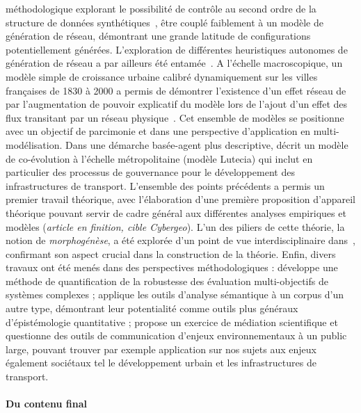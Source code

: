 méthodologique explorant le possibilité de contrôle au second ordre de la structure de données synthétiques~\cite{raimbault2016generation}, être couplé faiblement à un modèle de génération de réseau, démontrant une grande latitude de configurations potentiellement générées. L'exploration de différentes heuristiques autonomes de génération de réseau a par ailleurs été entamée~\cite{raimbault2015labex}. A l'échelle macroscopique, un modèle simple de croissance urbaine calibré dynamiquement sur les villes françaises de 1830 à 2000 a permis de démontrer l'existence d'un effet réseau de par l'augmentation de pouvoir explicatif du modèle lors de l'ajout d'un effet des flux transitant par un réseau physique~\cite{raimbault2016models}. Cet ensemble de modèles se positionne avec un objectif de parcimonie et dans une perspective d'application en multi-modélisation. Dans une démarche basée-agent plus descriptive, \cite{le2015modeling} décrit un modèle de co-évolution à l'échelle métropolitaine (modèle Lutecia) qui inclut en particulier des processus de gouvernance pour le développement des infrastructures de transport. L'ensemble des points précédents a permis un premier travail théorique, avec l'élaboration d'une première proposition d'appareil théorique pouvant servir de cadre général aux différentes analyses empiriques et modèles (\textit{article en finition, cible Cybergeo}). L'un des piliers de cette théorie, la notion de \emph{morphogénèse}, a été explorée d'un point de vue interdisciplinaire dans~\cite{antelope2016interdisciplinary}, confirmant son aspect crucial dans la construction de la théorie. Enfin, divers travaux ont été menés dans des perspectives méthodologiques : \cite{raimbault2016discrepancy} développe une méthode de quantification de la robustesse des évaluation multi-objectifs de systèmes complexes ; \cite{raimbault2016techno} applique les outils d'analyse sémantique à un corpus d'un autre type, démontrant leur potentialité comme outils plus généraux d'épistémologie quantitative ; \cite{serra2016game} propose un exercice de médiation scientifique et questionne des outils de communication d'enjeux environnementaux à un public large, pouvant trouver par exemple application sur nos sujets aux enjeux également sociétaux tel le développement urbain et les infrastructures de transport.







\paragraph{Du contenu final}

